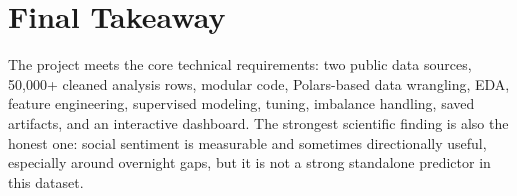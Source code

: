 \documentclass[11pt]{article}
\begin{document}
\section{Final Takeaway}

The project meets the core technical requirements: two public data sources, 50,000+ cleaned analysis rows, modular code, Polars-based data wrangling, EDA, feature engineering, supervised modeling, tuning, imbalance handling, saved artifacts, and an interactive dashboard. The strongest scientific finding is also the honest one: social sentiment is measurable and sometimes directionally useful, especially around overnight gaps, but it is not a strong standalone predictor in this dataset.
\end{document}
